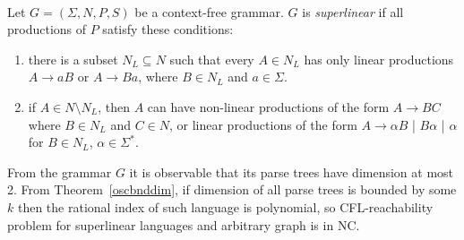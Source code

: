 \begin{example}
\\
Let $G = (\Sigma, N, P, S)$ be a context-free grammar. $G$ is \textit{superlinear} if all productions of $P$ satisfy these conditions:
\begin{enumerate}
\item there is a subset $N_L \subseteq N$ such that every $A \in N_L$ has only linear productions $A\rightarrow aB$ or $A\rightarrow Ba$, where $B \in N_L$ and $a \in \Sigma$.
\item if $A \in N \setminus N_L$, then $A$ can have non-linear productions of the form $A \rightarrow BC$ where $B\in N_L$ and $C \in N$, or linear productions of the form $A\rightarrow \alpha B$ | $B \alpha$ | $\alpha$ for $B \in N_L$, $\alpha \in \Sigma^*$.
\end{enumerate}
From the grammar $G$ it is observable that its parse trees have dimension at most 2. From 
Theorem~\ref{oscbnddim}, if dimension of all parse trees is bounded by some $k$ then the rational index of such language is polynomial, so CFL-reachability problem for superlinear languages and arbitrary graph is in NC.
\end{example}

